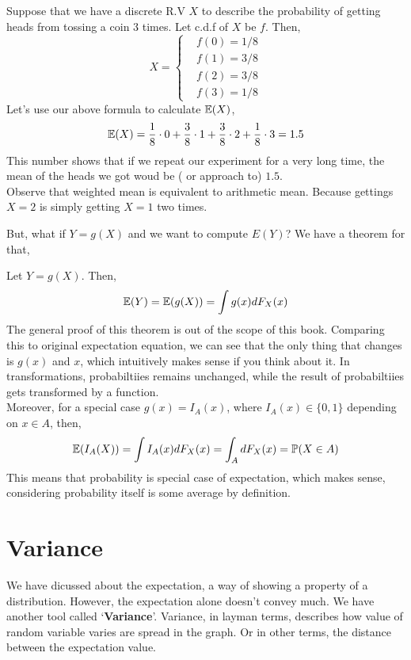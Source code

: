 \begin{example}
    Suppose that we have  a discrete R.V $X$ to describe the probability of getting heads from tossing a coin $3$ times.  Let  c.d.f of $X$ be $f$. Then,
    \[X = \begin{cases}
        &f(0) = 1/8\\
        &f(1) = 3/8 \\
        &f(2) = 3/8 \\
        &f(3) = 1/8
    \end{cases}\]
    Let's use our above formula to calculate ${\mathbb{E}}(X)$,
    \[{\mathbb{E}}(X) =  \frac{1}{8} \cdot 0 + \frac{3}{8} \cdot 1 + \frac{3}{8} \cdot 2 + \frac{1}{8} \cdot 3 = 1.5\]
    This number shows that if we repeat our experiment for a very long time, the mean of the heads we got woud be  ( or approach to) $1.5$.
    \\Observe that weighted mean is equivalent to arithmetic mean. Because gettings $X=2$ is simply getting $X=1$ two times.
\end{example}
\par
\vspace{10cm}
But, what if $Y= g(X)$ and we want to compute $E(Y)$? We have a theorem for that,
\begin{theorem}
    Let $Y = g(X)$. Then,
    \[\mathbb{E}(Y)= {\mathbb{E}} (g(X))= \int g(x) dF_X(x)\]
       The general proof of this theorem is out of the scope of this book. Comparing this to original expectation equation, we can see that the only thing that changes is $g(x)$ and $x$, which intuitively makes sense if you think about it. In transformations, probabiltiies remains unchanged, while the result of probabiltiies gets transformed by a function.
       \\ Moreover, for a special case $g(x) = I_A(x)$, where $I_A(x) \in \{ 0,1\}$ depending on $x \in A$, then,
       \[{\mathbb{E}} (I_A(X)) = \int I_A(x) d F_X(x) = \int_A dF_X(x) = \mathbb{P} (X \in A)\]
       This means that probability is special case of expectation, which makes sense, considering probability itself is some average by definition.
\end{theorem}
\section{Variance}
We have dicussed about the expectation, a way of showing a property of a distribution. However, the expectation alone doesn't convey much. We have another tool called `\textbf{Variance}'.
Variance, in layman terms, describes how value of random variable varies are spread in the graph. Or in other terms, the distance between the expectation value. 
\par

